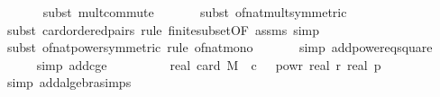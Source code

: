 \begin{isabellebody}
\ \ \ \ \ \isamarkupfalse%
\ {\isacharparenleft}{\kern0pt}subst\ mult{\isachardot}{\kern0pt}commute{\isacharparenright}{\kern0pt}\isanewline
\ \ \ \ \ \isamarkupfalse%
\ {\isacharparenleft}{\kern0pt}subst\ of{\isacharunderscore}{\kern0pt}nat{\isacharunderscore}{\kern0pt}mult{\isacharbrackleft}{\kern0pt}symmetric{\isacharbrackright}{\kern0pt}{\isacharparenright}{\kern0pt}\isanewline
\ \ \ \ \ \isamarkupfalse%
\ {\isacharparenleft}{\kern0pt}subst\ card{\isacharunderscore}{\kern0pt}ordered{\isacharunderscore}{\kern0pt}pairs{\isacharcomma}{\kern0pt}\ rule\ finite{\isacharunderscore}{\kern0pt}subset{\isacharbrackleft}{\kern0pt}OF\ assms{\isacharparenleft}{\kern0pt}{}{\isacharparenright}{\kern0pt}{\isacharbrackright}{\kern0pt}{\isacharcomma}{\kern0pt}\ simp{\isacharparenright}{\kern0pt}\isanewline
\ \ \ \ \ \isamarkupfalse%
\ {\isacharparenleft}{\kern0pt}subst\ of{\isacharunderscore}{\kern0pt}nat{\isacharunderscore}{\kern0pt}power{\isacharbrackleft}{\kern0pt}symmetric{\isacharbrackright}{\kern0pt}{\isacharcomma}{\kern0pt}\ rule\ of{\isacharunderscore}{\kern0pt}nat{\isacharunderscore}{\kern0pt}mono{\isacharparenright}{\kern0pt}\isanewline
\ \ \ \ \ \isamarkupfalse%
\ {\isacharparenleft}{\kern0pt}simp\ add{\isacharcolon}{\kern0pt}power{}{\isacharunderscore}{\kern0pt}eq{\isacharunderscore}{\kern0pt}square{\isacharparenright}{\kern0pt}\isanewline
\ \ \ \ \isamarkupfalse%
\ {\isacharparenleft}{\kern0pt}simp\ add{\isacharcolon}{\kern0pt}c{\isacharunderscore}{\kern0pt}ge{\isacharunderscore}{\kern0pt}{}{\isacharparenright}{\kern0pt}\isanewline
\ \ \isamarkupfalse%
\ \isamarkupfalse%
\ {\isachardoublequoteopen}{\isachardot}{\kern0pt}{\isachardot}{\kern0pt}{\isachardot}{\kern0pt}\ {\isacharequal}{\kern0pt}\ {}\ {\isacharasterisk}{\kern0pt}\ {\isacharparenleft}{\kern0pt}real\ {\isacharparenleft}{\kern0pt}card\ M{\isacharparenright}{\kern0pt}{\isacharparenright}{\kern0pt}\ {\isacharasterisk}{\kern0pt}\ c\ {\isacharasterisk}{\kern0pt}\ {}\ powr\ {\isacharparenleft}{\kern0pt}{\isacharminus}{\kern0pt}real\ r{\isacharparenright}{\kern0pt}\ {\isacharslash}{\kern0pt}{\isacharparenleft}{\kern0pt}real\ p{\isacharparenright}{\kern0pt}\isanewline
\ \ \ \ \isamarkupfalse%
\ {\isacharparenleft}{\kern0pt}simp\ add{\isacharcolon}{\kern0pt}algebra{\isacharunderscore}{\kern0pt}simps{\isacharparenright}{\kern0pt}\isanewline

\end{isabellebody}
